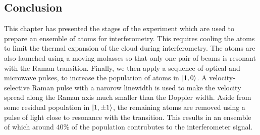 \subsection{Conclusion}
This chapter has presented the stages of the experiment which are used to prepare an ensemble of atoms for interferometry. This requires cooling the atoms to limit the thermal expansion of the cloud during interferometry. The atoms are also launched using a moving molasses so that only one pair of beams is resonant with the Raman transition. Finally, we then apply a sequence of optical and microwave pulses, to increase the population of atoms in \(\ket{1,0}\). A velocity-selective Raman pulse with a narorow linewidth is used to make the velocity spread along the Raman axis much smaller than the Doppler width. Aside from some residual population in \(\ket{1,\pm 1}\), the remaining atoms are removed using a pulse of light close to resonance with the  transition. This results in an ensemble of which around \(40\%\) of the population contrubutes to the interferometer signal.

